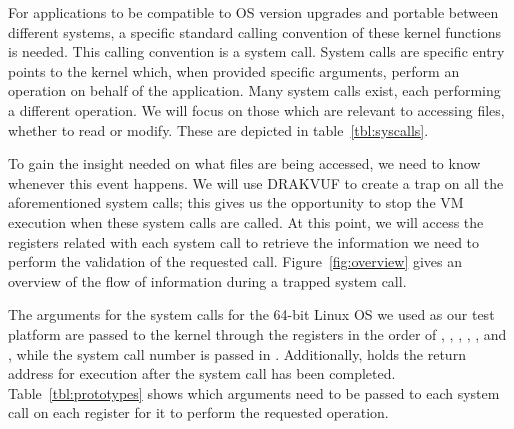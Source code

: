 \par For applications to be compatible to \ac{OS} version upgrades and portable between different systems, a specific standard calling convention of these kernel functions is needed. This calling convention is a system call. System calls are specific entry points to the kernel which, when provided specific arguments, perform an operation on behalf of the application. Many system calls exist, each performing a different operation. We will focus on those which are relevant to accessing files, whether to read or modify. These are depicted in table~\ref{tbl:syscalls}.

\par To gain the insight needed on what files are being accessed, we need to know whenever this event happens. We will use DRAKVUF to create a trap on all the aforementioned system calls; this gives us the opportunity to stop the \ac{VM} execution when these system calls are called. At this point, we will access the registers related with each system call to retrieve the information we need to perform the validation of the requested call. Figure~\ref{fig:overview} gives an overview of the flow of information during a trapped system call. 

\par The arguments for the system calls for the 64-bit Linux \ac{OS} we used as our test platform are passed to the kernel through the registers in the order of , , , , , and , while the system call number is passed in . Additionally,  holds the return address for execution after the system call has been completed. Table~\ref{tbl:prototypes} shows which arguments need to be passed to each system call on each register for it to perform the requested operation.

